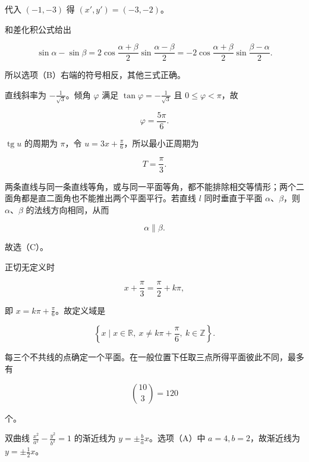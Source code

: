 \begin{answer}
代入 $(-1,-3)$ 得 $(x',y')=(-3,-2)$。


和差化积公式给出

\nopagebreak[4]
\[
\sin\alpha-\sin\beta
=2\cos\frac{\alpha+\beta}{2}\sin\frac{\alpha-\beta}{2}
=-2\cos\frac{\alpha+\beta}{2}\sin\frac{\beta-\alpha}{2}.
\]

所以选项（B）右端的符号相反，其他三式正确。


直线斜率为 $-\frac1{\sqrt3}$。倾角 $\varphi$ 满足 $\tan\varphi=-\frac1{\sqrt3}$ 且 $0\le\varphi<\pi$，故

\nopagebreak[4]
\[
\varphi=\frac{5\pi}{6}.
\]


$\operatorname{tg}u$ 的周期为 $\pi$，令 $u=3x+\frac\pi6$，所以最小正周期为

\nopagebreak[4]
\[
T=\frac\pi3.
\]


两条直线与同一条直线等角，或与同一平面等角，都不能排除相交等情形；两个二面角都是直二面角也不能推出两个平面平行。若直线 $l$ 同时垂直于平面 $\alpha$、$\beta$，则 $\alpha$、$\beta$ 的法线方向相同，从而

\nopagebreak[4]
\[
\alpha\parallel\beta.
\]

故选（C）。


正切无定义时

\nopagebreak[4]
\[
x+\frac\pi3=\frac\pi2+k\pi,
\]

即 $x=k\pi+\frac\pi6$。故定义域是

\nopagebreak[4]
\[
\left\{x\mid x\in\mathbb R,\ x\ne k\pi+\frac\pi6,\ k\in\mathbb Z\right\}.
\]


每三个不共线的点确定一个平面。在一般位置下任取三点所得平面彼此不同，最多有

\nopagebreak[4]
\[
\binom{10}{3}=120
\]

个。


双曲线 $\frac{x^2}{a^2}-\frac{y^2}{b^2}=1$ 的渐近线为 $y=\pm\frac ba x$。选项（A）中 $a=4,b=2$，故渐近线为 $y=\pm\frac12x$。



\end{answer}
